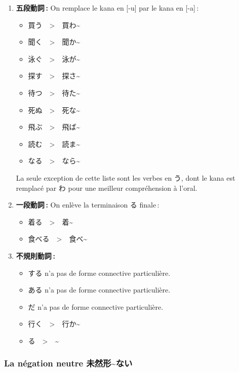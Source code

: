 \begin{enumerate}
    \item \textbf{五段動詞 :} On remplace le kana en [-u] par le kana en [-a] :
          \begin{itemize}
              \item 買う　>　買わ\~{}
              \item 聞く　>　聞か\~{}
              \item 泳ぐ　>　泳が\~{}
              \item 探す　>　探さ\~{}
              \item 待つ　>　待た\~{}
              \item 死ぬ　>　死な\~{}
              \item 飛ぶ　>　飛ば\~{}
              \item 読む　>　読ま\~{}
              \item なる　>　なら\~{}
          \end{itemize}
          La seule exception de cette liste sont les verbes en う, dont le kana est remplacé par わ pour une meilleur compréhension à l’oral.
    \item \textbf{一段動詞 :} On enlève la terminaison る finale :
          \begin{itemize}
              \item 着る　>　着\~{}
              \item 食べる　>　食べ\~{}
          \end{itemize}
    \item \textbf{不規則動詞 :}
          \begin{itemize}
              \item する n'a pas de forme connective particulière.
              \item ある n'a pas de forme connective particulière.
              \item だ n'a pas de forme connective particulière.
              \item 行く　>　行か\~{}
              \item {}る　>　\~{}
          \end{itemize}
\end{enumerate}

\subsubsection{La négation neutre 未然形\~{}ない}

